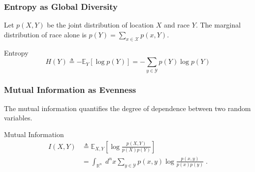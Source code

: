 \documentclass{beamer}
\begin{document}
	\iflong
	\begin{frame}\frametitle{Entropy as Global Diversity}
		Let $p(X,Y)$ be the joint distribution of location $X$ and race $Y$. The marginal distribution of race alone is $p(Y) = \sum_{x \in \mathcal{X}} p(x,Y)$. 
		\begin{block}{Entropy}
			\begin{equation*}
				H(Y) \triangleq - \mathbb{E}_Y[\log p(Y)] = -\sum_{y \in \mathcal{Y}} p(Y)\log p(Y)
			\end{equation*}
		\end{block}
	\end{frame}
	\begin{frame}\frametitle{Mutual Information as Evenness}
		The mutual information quantifies the degree of dependence between two random variables.
		\begin{block}{Mutual Information}
			\begin{align*}
				I(X,Y) &\triangleq \mathbb{E}_{X,Y}\left[\log \frac{p(X,Y)}{p(X)p(Y)}\right] \\
				&= \int_{\mathbb{R}^n} \; d^nx  \sum_{y \in \mathcal{Y}} p(x,y) \log \frac{p(x,y)}{p(x)p(y)}\;.
			\end{align*}	
		\end{block}
	\end{frame}
\end{document}
